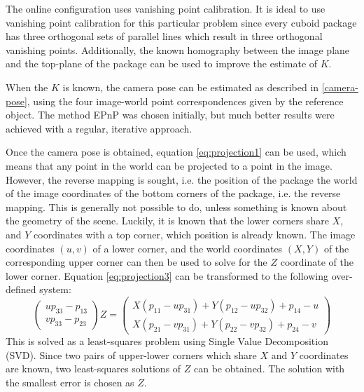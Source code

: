 The online configuration uses vanishing point calibration.
It is ideal to use vanishing point calibration for this particular problem since every cuboid package has three orthogonal sets of parallel lines which result in three orthogonal vanishing points.
Additionally, the known homography between the image plane and the top-plane of the package can be used to improve the estimate of $K$.

When the $K$ is known, the camera pose can be estimated as described in \ref{camera-pose}, using the four image-world point correspondences given by the reference object.
The method EPnP was chosen initially, but much better results were achieved with a regular, iterative approach. %

Once the camera pose is obtained, equation \ref{eq:projection1} can be used, which means that any point in the world can be projected to a point in the image.
However, the reverse mapping is sought, i.e. the position of the package the world of the image coordinates of the bottom corners of the package, i.e. the reverse mapping.
This is generally not possible to do, unless something is known about the geometry of the scene.
Luckily, it is known that the lower corners share $X$, and $Y$ coordinates with a top corner, which position is already known.
The image coordinates $(u,v)$ of a lower corner, and the world coordinates $(X,Y)$ of the corresponding upper corner can then be used to solve for the $Z$ coordinate of the lower corner. 
Equation \ref{eq:projection3} can be transformed to the following over-defined system:
\begin{equation} \label{eq:constrained-projection}
\begin{pmatrix} up_{33}-p_{13} \\ vp_{33}-p_{23} \end{pmatrix} Z = 
\begin{pmatrix}
X(p_{11}-up_{31}) + Y(p_{12}-up_{32})+p_{14}-u \\
X(p_{21}-vp_{31}) + Y(p_{22}-vp_{32})+p_{24}-v
\end{pmatrix}
\end{equation}
This is solved as a least-squares problem using Single Value Decomposition (SVD).
Since two pairs of upper-lower corners which share $X$ and $Y$ coordinates are known, two least-squares solutions of $Z$ can be obtained.
The solution with the smallest error is chosen as $Z$.

